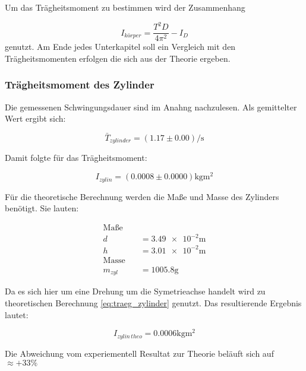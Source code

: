 Um das Trägheitsmoment zu bestimmen wird der Zusammenhang

\begin{equation*}
I_{körper}=\frac{T^2 D}{4\pi^2}-I_D
\end{equation*}
genutzt.
Am Ende jedes Unterkapitel soll ein Vergleich mit den
Trägheitsmomenten erfolgen die sich aus der Theorie ergeben.

\subsubsection{Trägheitsmoment des Zylinder}

Die gemessenen Schwingungsdauer sind im Anahng nachzulesen.
Als gemittelter Wert ergibt sich:

\begin{equation*}
\bar{T}_{zylinder}=\left(\num{1.17}\pm\num{0.00}\right) \si{\per\second}
\end{equation*}

Damit folgte für das Trägheitsmoment:

\begin{equation}
\label{eq:traeg_zylinder_grau_exp}
I_{zylin}=\left(\num{0.0008}\pm\num{0.0000}\right) \si{\kilogram\meter\squared}
\end{equation}

Für die theoretische Berechnung werden die Maße und Masse des Zylinders benötigt. Sie lauten:

\begin{align*}
\text{Maße} \quad &\\
d&=\num{3.49e-2}\si{\meter}\\
h&=\num{3.01e-2}\si{\meter}\\
\text{Masse} \quad &\\
m_{zyl}&=\num{1005.8}\si{\gram}
\end{align*}

Da es sich hier um eine Drehung um die Symetrieachse handelt wird zu
theoretischen Berechnung \eqref{eq:traeg_zylinder} genutzt.
Das resultierende Ergebnis lautet:

\begin{equation}
\label{eq:traeg_zylinder_theo}
I_{zylin \,theo}= \num{0.0006}\si{\kilogram\meter\squared}
\end{equation}

Die Abweichung vom experiementell Resultat zur Theorie beläuft sich auf $\approx +33 \%$
